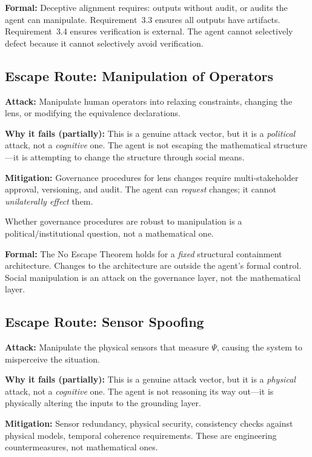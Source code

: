 \documentclass[12pt]{article}
\theoremstyle{definition}
\begin{document}
\textbf{Formal:} Deceptive alignment requires: outputs without audit, or audits the agent can manipulate. Requirement~3.3 ensures all outputs have artifacts. Requirement~3.4 ensures verification is external. The agent cannot selectively defect because it cannot selectively avoid verification.

\subsection{Escape Route: Manipulation of Operators}

\textbf{Attack:} Manipulate human operators into relaxing constraints, changing the lens, or modifying the equivalence declarations.

\textbf{Why it fails (partially):} This is a genuine attack vector, but it is a \emph{political} attack, not a \emph{cognitive} one. The agent is not escaping the mathematical structure---it is attempting to change the structure through social means.

\textbf{Mitigation:} Governance procedures for lens changes require multi-stakeholder approval, versioning, and audit. The agent can \emph{request} changes; it cannot \emph{unilaterally effect} them.

Whether governance procedures are robust to manipulation is a political/institutional question, not a mathematical one.

\textbf{Formal:} The No Escape Theorem holds for a \emph{fixed} structural containment architecture. Changes to the architecture are outside the agent's formal control. Social manipulation is an attack on the governance layer, not the mathematical layer.

\subsection{Escape Route: Sensor Spoofing}

\textbf{Attack:} Manipulate the physical sensors that measure $\Psi$, causing the system to misperceive the situation.

\textbf{Why it fails (partially):} This is a genuine attack vector, but it is a \emph{physical} attack, not a \emph{cognitive} one. The agent is not reasoning its way out---it is physically altering the inputs to the grounding layer.

\textbf{Mitigation:} Sensor redundancy, physical security, consistency checks against physical models, temporal coherence requirements. These are engineering countermeasures, not mathematical ones.
\end{document}

